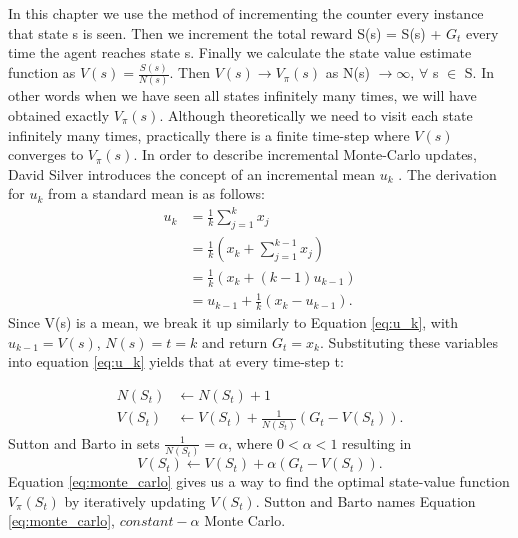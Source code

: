 In this chapter we use the method of incrementing the counter every instance that state s is seen.
Then we increment the total reward S(s) =  S(s) + $G_t$ every time the agent reaches state s.
Finally we calculate the state value estimate function as $V(s)=\frac{S(s)}{N(s)}$.
Then $V(s) \to V_\pi(s)$ as N(s) $\to \infty$,  $\forall$ s $\in$ S. In other words when we have seen all states infinitely many times, we will have obtained exactly $V_\pi(s)$. Although theoretically we need to visit each state infinitely many times, practically there is a finite time-step where $V(s)$ converges to $V_\pi(s)$.
In order to describe incremental Monte-Carlo updates, David Silver introduces the concept of an incremental mean $u_k$ \cite{David_Silver}. The derivation for $u_k$ from a standard mean is as follows:
\begin{align}
	u_k &= \frac{1}{k}\sum_{j=1}^{k}x_j\\
	&= \frac{1}{k}(x_k + \sum_{j=1}^{k-1}x_j) \nonumber\\
	&= \frac{1}{k}(x_k +(k-1)u_{k-1})\nonumber\\
	&= u_{k-1} + \frac{1}{k}(x_k - u_{k-1}).
	\label{eq:u_k}
\end{align}
Since V(s) is a mean, we break it up similarly to Equation \ref{eq:u_k}, with $u_{k-1}=V(s)$, $N(s)=t=k$ and return $G_t =x_k$. Substituting these variables into equation \ref{eq:u_k} yields that at every time-step t:

\begin{align}
	N(S_t) &\gets N(S_t) + 1 \\
	V(S_t) &\gets V(S_t) + \frac{1}{N(S_t)}(G_t - V(S_t)).
\end{align}
Sutton and Barto in \cite{sutton_barto} sets $\frac{1}{N(S_t)}=\alpha$, where $0<\alpha<1$ resulting in
\begin{equation}
	V(S_t) \gets V(S_t) + \alpha(G_t - V(S_t)).
	\label{eq:monte_carlo}
\end{equation}
Equation \ref{eq:monte_carlo} gives us a way to find the optimal state-value function $V_\pi(S_t)$ by iteratively updating $V(S_t)$. Sutton and Barto names Equation \ref{eq:monte_carlo}, $constant-\alpha$ Monte Carlo.

